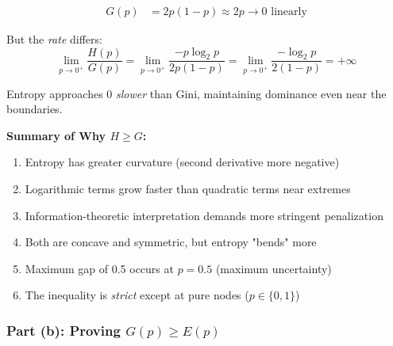 \documentclass[12pt]{article}
\begin{document}
\begin{explanation}
\begin{align*}
G(p) &= 2p(1-p) \approx 2p \to 0 \text{ linearly}
\end{align*}

But the \textit{rate} differs:
\[
\lim_{p\to 0^+} \frac{H(p)}{G(p)} = \lim_{p\to 0^+} \frac{-p\log_2 p}{2p(1-p)} = \lim_{p\to 0^+} \frac{-\log_2 p}{2(1-p)} = +\infty
\]

Entropy approaches 0 \textit{slower} than Gini, maintaining dominance even near the boundaries.

\textbf{Summary of Why $H \geq G$:}

\begin{enumerate}
    \item Entropy has greater curvature (second derivative more negative)
    \item Logarithmic terms grow faster than quadratic terms near extremes
    \item Information-theoretic interpretation demands more stringent penalization
    \item Both are concave and symmetric, but entropy "bends" more
    \item Maximum gap of 0.5 occurs at $p=0.5$ (maximum uncertainty)
    \item The inequality is \textit{strict} except at pure nodes ($p \in \{0,1\}$)
\end{enumerate}
\end{explanation}

\subsubsection{Part (b): Proving $G(p) \geq E(p)$}
\end{document}

